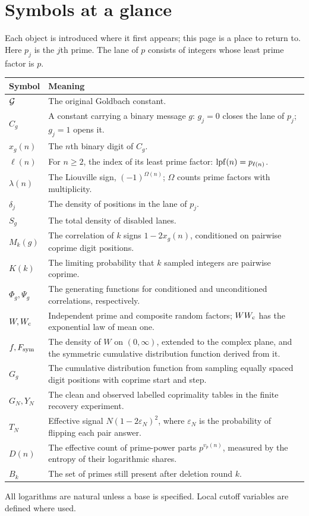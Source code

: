 \section*{Symbols at a glance}
{}
\label{app:notation}

Each object is introduced where it first appears; this page is a place
to return to. Here $p_j$ is the $j$th prime. The lane of $p$ consists
of integers whose least prime factor is $p$.

\renewcommand{\arraystretch}{1.35}
\begin{longtable}{@{}p{.23\linewidth}p{.72\linewidth}@{}}
\toprule
Symbol & Meaning \\
\midrule
\endhead
$\mathcal G$ & The original Goldbach constant. \\
$C_g$ & A constant carrying a binary message $g$:
$g_j=0$ closes the lane of $p_j$; $g_j=1$ opens it. \\
$x_g(n)$ & The $n$th binary digit of $C_g$. \\
$\ell(n)$ & For $n\ge2$, the index of its least prime factor:
$\operatorname{lpf}(n)=p_{\ell(n)}$. \\
$\lambda(n)$ & The Liouville sign, $(-1)^{\Omega(n)}$;
$\Omega$ counts prime factors with multiplicity. \\
$\delta_j$ & The density of positions in the lane of $p_j$. \\
$S_g$ & The total density of disabled lanes. \\
$M_k(g)$ & The correlation of $k$ signs $1-2x_g(n)$, conditioned on pairwise coprime digit positions. \\
$K(k)$ & The limiting probability that $k$ sampled integers are pairwise coprime. \\
$\Phi_g,\Psi_g$ & The generating functions for conditioned and unconditioned correlations, respectively. \\
$W,W_{\mathrm c}$ & Independent prime and composite random factors;
$WW_{\mathrm c}$ has the exponential law of mean one. \\
$f,F_{\mathrm{sym}}$ & The density of $W$ on $(0,\infty)$, extended to the complex plane,
and the symmetric cumulative distribution function derived from it. \\
$G_g$ & The cumulative distribution function from sampling equally spaced
digit positions with coprime start and step. \\
$G_N,Y_N$ & The clean and observed labelled coprimality tables in the finite recovery experiment. \\
$T_N$ & Effective signal $N(1-2\varepsilon_N)^2$, where $\varepsilon_N$
is the probability of flipping each pair answer. \\
$D(n)$ & The effective count of prime-power parts $p^{v_p(n)}$,
measured by the entropy of their logarithmic shares. \\
$B_k$ & The set of primes still present after deletion round $k$. \\
\bottomrule
\end{longtable}
\renewcommand{\arraystretch}{1}

\noindent All logarithms are natural unless a base is specified.
Local cutoff variables are defined where used.
